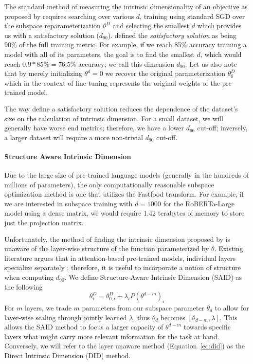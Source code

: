 \documentclass{article} \usepackage{iclr2020_conference,times}
\begin{document}
The standard method of measuring the intrinsic dimensionality of an objective as proposed by \cite{intrinsic_dimension} requires searching over various $d$, training using standard SGD over the subspace reparameterization $\theta^{D}$ and selecting the smallest $d$ which provides us with a satisfactory solution ($d_{90}$). \cite{intrinsic_dimension} defined the \textit{satisfactory solution} as being 90\% of the full training metric. For example, if we reach 85\% accuracy training a model with all of its parameters, the goal is to find the smallest $d$, which would reach $0.9 * 85\% = 76.5\%$ accuracy; we call this dimension $d_{90}$. Let us also note that by merely initializing $\theta^d = 0$ we recover the original parameterization $\theta^{D}_0$ which in the context of fine-tuning represents the original weights of the pre-trained model.

The way \cite{intrinsic_dimension} define a satisfactory solution reduces the dependence of the dataset's size on the calculation of intrinsic dimension. For a small dataset, we will generally have worse end metrics; therefore, we have a lower $d_{90}$ cut-off; inversely, a larger dataset will require a more non-trivial $d_{90}$ cut-off.
\paragraph{Structure Aware Intrinsic Dimension}
Due to the large size of pre-trained language models (generally in the hundreds of millions of parameters), the only computationally reasonable subspace optimization method is one that utilizes the Fastfood transform. For example, if we are interested in subspace training with $d=1000$ for the RoBERTa-Large model using a dense matrix, we would require 1.42 terabytes of memory to store just the projection matrix.

Unfortunately, the method of finding the intrinsic dimension proposed by \cite{intrinsic_dimension} is unaware of the layer-wise structure of the function parameterized by $\theta$. Existing literature argues that in attention-based pre-trained models, individual layers specialize separately \citep{what_does_bert_look_at}; therefore, it is useful to incorporate a notion of structure when computing $d_{90}$. 
We define Structure-Aware Intrinsic Dimension (SAID) as the following
\begin{equation}
    \theta^{D}_i = \theta^{D}_{0, i} + \lambda_i P(\theta^{d-m})_i
\end{equation}
For $m$ layers, we trade $m$ parameters from our subspace parameter $\theta_d$ to allow for layer-wise scaling through jointly learned $\lambda$, thus $\theta_d$ becomes $\left[\theta_{d-m}, \lambda\right]$. This allows the SAID method to focus a larger capacity of $\theta^{d-m}$ towards specific layers what might carry more relevant information for the task at hand. Conversely, we will refer to the layer unaware method (Equation~\ref{eq:did}) as the Direct Intrinsic Dimension (DID) method.
\end{document}
